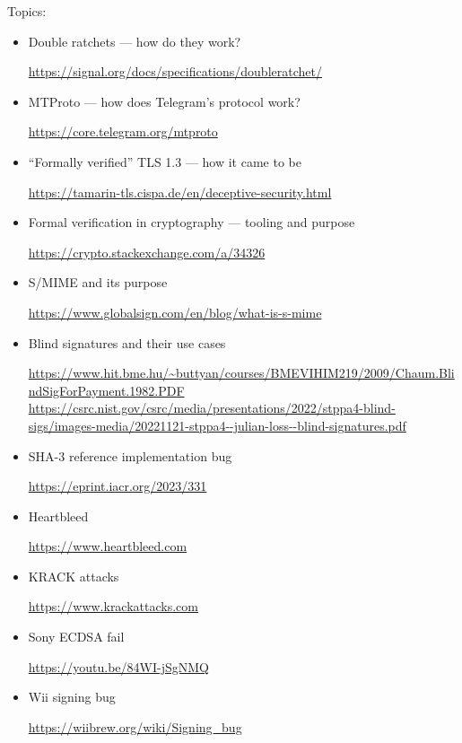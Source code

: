 \documentclass[usegeometry,parskip=half]{scrartcl}
\begin{document}
Topics:
\begin{itemize}
  \item Double ratchets --- how do they work?

  \url{https://signal.org/docs/specifications/doubleratchet/}

  \item MTProto --- how does Telegram's protocol work?
  
  \url{https://core.telegram.org/mtproto}

  \item \enquote{Formally verified} TLS 1.3 --- how it came to be
  
  \url{https://tamarin-tls.cispa.de/en/deceptive-security.html}

  \item Formal verification in cryptography --- tooling and purpose
  
  \url{https://crypto.stackexchange.com/a/34326}

  \item S/MIME and its purpose
  
  \url{https://www.globalsign.com/en/blog/what-is-s-mime}

  \item Blind signatures and their use cases
  
  \url{https://www.hit.bme.hu/~buttyan/courses/BMEVIHIM219/2009/Chaum.BlindSigForPayment.1982.PDF}\\
  \url{https://csrc.nist.gov/csrc/media/presentations/2022/stppa4-blind-sigs/images-media/20221121-stppa4--julian-loss--blind-signatures.pdf}

  \item SHA-3 reference implementation bug
  
  \url{https://eprint.iacr.org/2023/331}

  \item Heartbleed
  
  \url{https://www.heartbleed.com}

  \item KRACK attacks
  
  \url{https://www.krackattacks.com}

  \item Sony ECDSA fail
  
  \url{https://youtu.be/84WI-jSgNMQ}

  \item Wii signing bug
  
  \url{https://wiibrew.org/wiki/Signing_bug}


\end{itemize}
\end{document}
